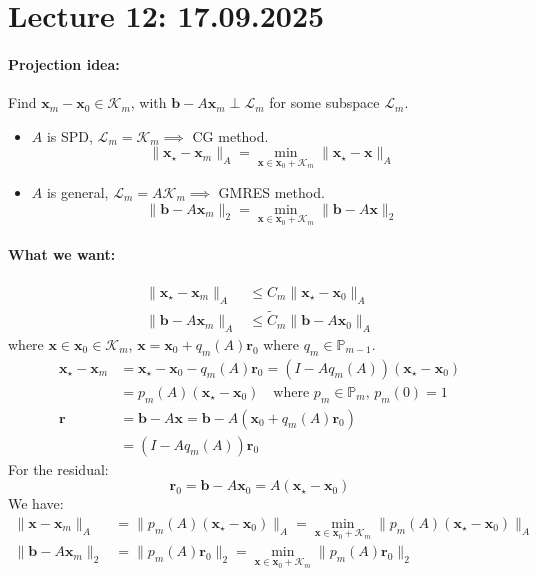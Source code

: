 \section{Lecture 12: 17.09.2025}
\paragraph{Projection idea:}
Find $\mathbf{x}_m - \mathbf{x}_0 \in \mathcal{K}_m$, with $\mathbf{b} - A \mathbf{x}_m \perp \mathcal{L}_m$ for some subspace $\mathcal{L}_m$.
\begin{itemize}
    \item $A$ is SPD, $\mathcal{L}_m = \mathcal{K}_m \implies$ CG method.
          \[
              \|\mathbf{x}_{\star} - \mathbf{x}_m\|_A = \min_{\mathbf{x} \in \mathbf{x}_0 + \mathcal{K}_m} \|\mathbf{x}_{\star} - \mathbf{x}\|_A \tag{CG}
          \]
    \item $A$ is general, $\mathcal{L}_m = A \mathcal{K}_m \implies$ GMRES method.
          \[
              \|\mathbf{b} - A \mathbf{x}_m\|_2 = \min_{\mathbf{x} \in \mathbf{x}_0 + \mathcal{K}_m} \|\mathbf{b} - A \mathbf{x}\|_2 \tag{GMRES}
          \]
\end{itemize}
\paragraph{What we want:}
\begin{align*}
    \|\mathbf{x}_{\star} - \mathbf{x}_m\|_A & \leq C_m \|\mathbf{x}_{\star} - \mathbf{x}_0\|_A \tag{CG}      \\
    \|\mathbf{b} - A \mathbf{x}_m\|_A       & \leq \tilde{C}_m \|\mathbf{b} - A \mathbf{x}_0\|_A \tag{GMRES}
\end{align*}
where $\mathbf{x} \in \mathbf{x}_0 \in \mathcal{K}_m$, $\mathbf{x} = \mathbf{x}_0 + q_m(A) \mathbf{r}_0$ where $q_m \in \mathbb{P}_{m-1}$.
\begin{align*}
    \mathbf{x}_{\star} - \mathbf{x}_m & = \mathbf{x}_{\star} - \mathbf{x}_0 - q_m(A) \mathbf{r}_0 = (I - A q_m(A)) (\mathbf{x}_{\star} - \mathbf{x}_0) \\
                                      & = p_m(A) (\mathbf{x}_{\star} - \mathbf{x}_0) \quad \text{where } p_m \in \mathbb{P}_m, \, p_m(0) = 1           \\
    \mathbf{r}                        & = \mathbf{b} - A \mathbf{x} = \mathbf{b} - A (\mathbf{x}_0 + q_m(A) \mathbf{r}_0)                              \\
                                      & = (I - A q_m(A)) \mathbf{r}_0
\end{align*}
For the residual:
\[
    \mathbf{r}_0 = \mathbf{b} - A \mathbf{x}_0 = A (\mathbf{x}_{\star} - \mathbf{x}_0)
\]
We have:
\begin{align*}
    \|\mathbf{x} - \mathbf{x}_m\|_A   & = \|p_m(A) (\mathbf{x}_{\star} - \mathbf{x}_0)\|_A = \min_{\mathbf{x} \in \mathbf{x}_0 + \mathcal{K}_m} \|p_m(A) (\mathbf{x}_{\star} - \mathbf{x}_0)\|_A \tag{CG} \\
    \|\mathbf{b} - A \mathbf{x}_m\|_2 & = \|p_m(A) \mathbf{r}_0\|_2 = \min_{\mathbf{x} \in \mathbf{x}_0 + \mathcal{K}_m} \|p_m(A) \mathbf{r}_0\|_2 \tag{GMRES}
\end{align*}


